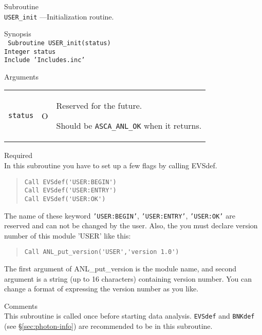 \newpage
\begin{description}
\item{Subroutine}\\
   {\tt USER\_init} ---Initialization routine.
\item{Synopsis}\\
   {\tt
     Subroutine USER\_init(status) \\
     Integer status \\
     Include 'Includes.inc' 
   }
\item{Arguments} \\
 \begin{tabular}{l@{\ (}c@{)\ }p{}}
   {\tt status} & O & Reserved for the future.\par
                      Should be {\tt ASCA\_ANL\_OK} when it returns.
 \end{tabular}
\item{Required} \\
   In this subroutine you have to set up a few flags by calling EVSdef.
\begin{quote}\baselineskip 3.2mm\begin{verbatim}
Call EVSdef('USER:BEGIN')
Call EVSdef('USER:ENTRY')
Call EVSdef('USER:OK')
\end{verbatim}\end{quote}
   The name of these keyword {\tt 'USER:BEGIN'}, {\tt 'USER:ENTRY'},
   {\tt 'USER:OK'} are reserved and can not be changed by the user.
   Also,
   the you must declare version number of this module 'USER' like this:
\begin{quote}\baselineskip 3.2mm\begin{verbatim}
Call ANL_put_version('USER','version 1.0')
\end{verbatim}\end{quote}
   The first argument of ANL\_put\_version is the module name,
   and second argument is a string (up to 16 characters)
   containing version number.
   You can change a format of expressing the version number as you like.

\item{Comments} \\
   This subroutine is called once before starting data analysis.
   {\tt EVSdef} and {\tt BNKdef} (see \S \ref{sec:photon-info})
   are recommended to be in this subroutine.
\end{description}

\vspace{1cm}

